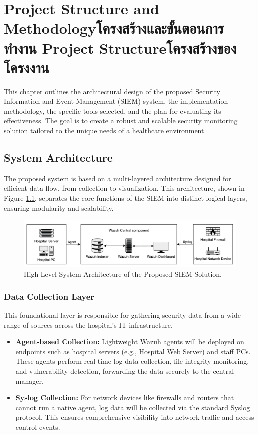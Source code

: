 \chapter{\ifproject%
\ifenglish Project Structure and Methodology\else โครงสร้างและขั้นตอนการทำงาน\fi
\else%
\ifenglish Project Structure\else โครงสร้างของโครงงาน\fi
\fi
}
This chapter outlines the architectural design of the proposed Security Information and Event Management (SIEM) system, the implementation methodology, the specific tools selected, and the plan for evaluating its effectiveness. The goal is to create a robust and scalable security monitoring solution tailored to the unique needs of a healthcare environment.
\section{System Architecture}
\label{sec:architecture}
The proposed system is based on a multi-layered architecture designed for efficient data flow, from collection to visualization. This architecture, shown in Figure \ref{fig:system_architecture}, separates the core functions of the SIEM into distinct logical layers, ensuring modularity and scalability.
\begin{figure}[h!]
    \centering
    \includegraphics[width=\textwidth]{images/system_architecture.png} 
    \caption{High-Level System Architecture of the Proposed SIEM Solution.}
    \label{fig:system_architecture}
\end{figure}

\subsection{Data Collection Layer}
This foundational layer is responsible for gathering security data from a wide range of sources across the hospital's IT infrastructure. 
\begin{itemize}
    \item \textbf{Agent-based Collection:} Lightweight Wazuh agents will be deployed on endpoints such as hospital servers (e.g., Hospital Web Server) and staff PCs. These agents perform real-time log data collection, file integrity monitoring, and vulnerability detection, forwarding the data securely to the central manager.
    \item \textbf{Syslog Collection:} For network devices like firewalls and routers that cannot run a native agent, log data will be collected via the standard Syslog protocol. This ensures comprehensive visibility into network traffic and access control events.
\end{itemize}

